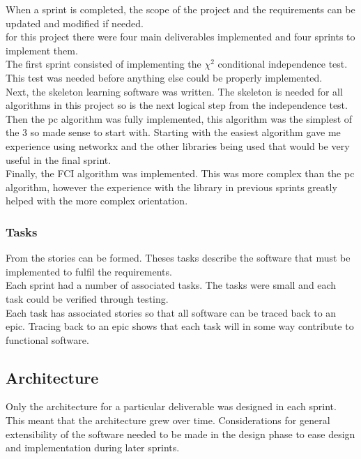 \documentclass{article}
\begin{document}
When a sprint is completed, the scope of the project and the requirements can be updated and modified if needed.\\



for this project there were four main deliverables implemented and four sprints to implement them.\\

The first sprint consisted of implementing the $\chi ^2$ conditional independence test. This test was needed before anything else could be properly implemented.\\

Next, the skeleton learning software was written. The skeleton is needed for all algorithms in this project so is the next logical step from the independence test.\\

Then the pc algorithm was fully implemented, this algorithm was the simplest of the 3 so made sense to start with. Starting with the easiest algorithm gave me experience using networkx and the other libraries being used that would be very useful in the final sprint.\\

Finally, the FCI algorithm was implemented. This was more complex than the pc algorithm, however the experience with the library in previous sprints greatly helped with the more complex orientation.\\

\subsubsection{Tasks}
From the stories can be formed. Theses tasks describe the software that must be implemented to fulfil the requirements. \\

Each sprint had a number of associated tasks. The tasks were small and each task could be verified through testing.\\

Each task has associated stories so that all software can be traced back to an epic. Tracing back to an epic shows that each task will in some way contribute to functional software.\\
\subsection{Architecture}
Only the architecture for a particular deliverable was designed in each sprint. This meant that the architecture grew over time. Considerations for general extensibility of the software needed to be made in the design phase to ease design and implementation during later sprints.\\
\end{document}
